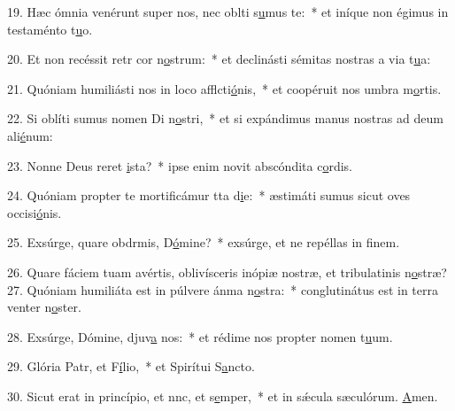 19. Hæc ómnia venérunt super nos, nec oblti s\uline{u}mus te:~* et iníque non égimus in testaménto t\uline{u}o.\par 
20. Et non recéssit retr cor n\uline{o}strum:~* et declinásti sémitas nostras a via t\uline{u}a:\par 
21. Quóniam humiliásti nos in loco afflcti\uline{ó}nis,~* et coopéruit nos umbra m\uline{o}rtis.\par 
22. Si oblíti sumus nomen Di n\uline{o}stri,~* et si expándimus manus nostras ad deum ali\uline{é}num:\par 
23. Nonne Deus reret \uline{i}sta?~* ipse enim novit abscóndita c\uline{o}rdis.\par 
24. Quóniam propter te mortificámur tta d\uline{i}e:~* æstimáti sumus sicut oves occisi\uline{ó}nis.\par 
25. Exsúrge, quare obdrmis, D\uline{ó}mine?~* exsúrge, et ne repéllas in f\uline{i}nem.\par 
26. Quare fáciem tuam avértis, oblivísceris inópiæ nostræ, et tribulatinis n\uline{o}stræ?
27. Quóniam humiliáta est in púlvere ánma n\uline{o}stra:~* conglutinátus est in terra venter n\uline{o}ster.\par 
28. Exsúrge, Dómine, djuv\uline{a} nos:~* et rédime nos propter nomen t\uline{u}um.\par 
29. Glória Patr, et F\uline{í}lio,~* et Spirítui S\uline{a}ncto.\par 
30. Sicut erat in princípio, et nnc, et s\uline{e}mper,~* et in sǽcula sæculórum. \uline{A}men.\par 

